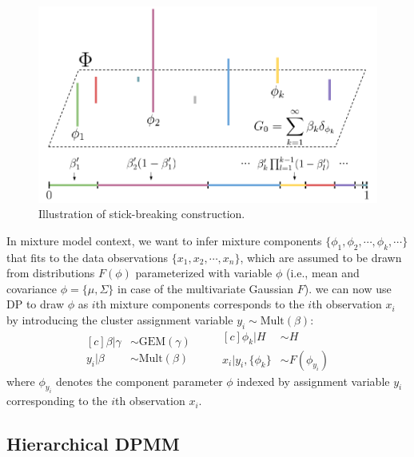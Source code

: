 \documentclass{article}
\begin{document}
\begin{figure}[ht]
    \centering
    \includegraphics[width=0.8\linewidth]{figs/stick-breaking.pdf}
    \caption{Illustration of stick-breaking construction.}
    \label{fig:stick_breaking}
\end{figure}
In mixture model context, we want to infer mixture components $\{\phi_{1}, \phi_{2}, \cdots, \phi_{k}, \cdots\}$ that fits to the data observations $\{x_{1}, x_{2}, \cdots, x_{n}\}$, which are assumed to be drawn from distributions $F(\phi)$ parameterized with variable $\phi$ (i.e., mean and covariance $\phi = \{\mu, \Sigma\}$ in case of the multivariate Gaussian $F$). we can now use DP to draw $\phi$ as $i$th mixture components corresponds to the $i$th observation $x_{i}$ by introducing the cluster assignment variable $y_{i} \sim \text{Mult}(\beta)$:
\begin{equation}\label{eq:dpmm}
\begin{aligned}[c]
    \beta|\gamma &\sim \text{GEM}(\gamma) \\
    y_{i}|\beta &\sim \text{Mult}(\beta)
\end{aligned}
\qquad
\begin{aligned}[c]
    \phi_{k}|H &\sim H \\
    x_{i}|y_{i},\{\phi_{k}\} &\sim F(\phi_{y_{i}}) 
\end{aligned}
\end{equation}
where $\phi_{y_{i}}$ denotes the component parameter $\phi$ indexed by assignment variable $y_{i}$ corresponding to the $i$th observation $x_{i}$.

\subsection{Hierarchical DPMM}\label{sec:hdpgmm:hdpmm}
\end{document}
